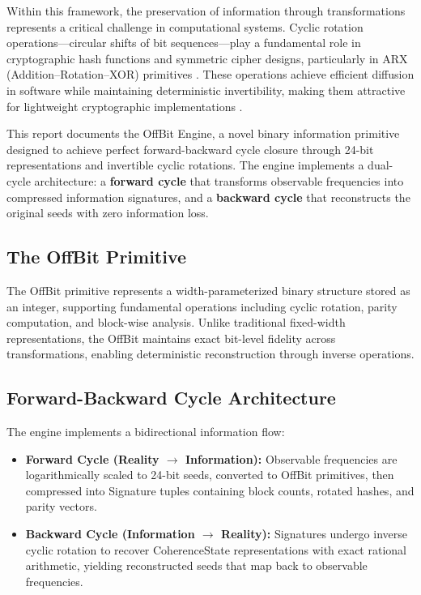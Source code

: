\documentclass[11pt,letterpaper]{article}
\begin{document}
Within this framework, the preservation of information through transformations represents a critical challenge in computational systems. Cyclic rotation operations—circular shifts of bit sequences—play a fundamental role in cryptographic hash functions and symmetric cipher designs, particularly in ARX (Addition–Rotation–XOR) primitives \cite{windarta2022,nist2023}. These operations achieve efficient diffusion in software while maintaining deterministic invertibility, making them attractive for lightweight cryptographic implementations \cite{windarta2022}.

This report documents the OffBit Engine, a novel binary information primitive designed to achieve perfect forward-backward cycle closure through 24-bit representations and invertible cyclic rotations. The engine implements a dual-cycle architecture: a \textbf{forward cycle} that transforms observable frequencies into compressed information signatures, and a \textbf{backward cycle} that reconstructs the original seeds with zero information loss.

\subsection{The OffBit Primitive}

The OffBit primitive represents a width-parameterized binary structure stored as an integer, supporting fundamental operations including cyclic rotation, parity computation, and block-wise analysis. Unlike traditional fixed-width representations, the OffBit maintains exact bit-level fidelity across transformations, enabling deterministic reconstruction through inverse operations.

\subsection{Forward-Backward Cycle Architecture}

The engine implements a bidirectional information flow:

\begin{itemize}
    \item \textbf{Forward Cycle (Reality $\rightarrow$ Information):} Observable frequencies are logarithmically scaled to 24-bit seeds, converted to OffBit primitives, then compressed into Signature tuples containing block counts, rotated hashes, and parity vectors.

    \item \textbf{Backward Cycle (Information $\rightarrow$ Reality):} Signatures undergo inverse cyclic rotation to recover CoherenceState representations with exact rational arithmetic, yielding reconstructed seeds that map back to observable frequencies.
\end{itemize}
\end{document}
